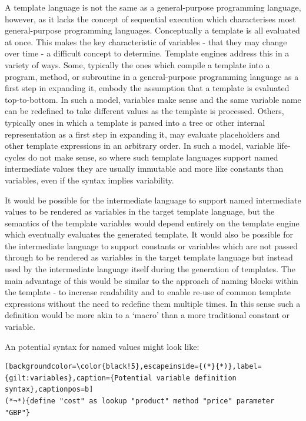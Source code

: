A template language is not the same as a general-purpose programming language, however, as it lacks the concept of sequential execution which characterises most general-purpose programming languages. Conceptually a template is all evaluated at once. This makes the key characteristic of variables - that they may change over time - a difficult concept to determine. Template engines address this in a variety of ways. Some, typically the ones which compile a template into a program, method, or subroutine in a general-purpose programming language as a first step in expanding it, embody the assumption that a template is evaluated top-to-bottom. In such a model, variables make sense and the same variable name can be redefined to take different values as the template is processed. Others, typically ones in which a template is parsed into a tree or other internal representation as a first step in expanding it, may evaluate placeholders and other template expressions in an arbitrary order. In such a model, variable life-cycles do not make sense, so where such template languages support named intermediate values they are usually immutable and more like constants than variables, even if the syntax implies variability.

It would be possible for the intermediate language to support named intermediate values to be rendered as variables in the target template language, but the semantics of the template variables would depend entirely on the template engine which eventually evaluates the generated template. It would also be possible for the intermediate language to support constants or variables which are not passed through to be rendered as variables in the target template language but instead used by the intermediate language itself during the generation of templates. The main advantage of this would be similar to the approach of naming blocks within the template - to increase readability and to enable re-use of common template expressions without the need to redefine them multiple times. In this sense such a definition would be more akin to a `macro' than a more traditional constant or variable.

An potential syntax for named values might look like:

\begin{lstlisting}[backgroundcolor=\color{black!5},escapeinside={(*}{*)},label={gilt:variables},caption={Potential variable definition syntax},captionpos=b]
(*¬*){define "cost" as lookup "product" method "price" parameter "GBP"}
\end{lstlisting}

